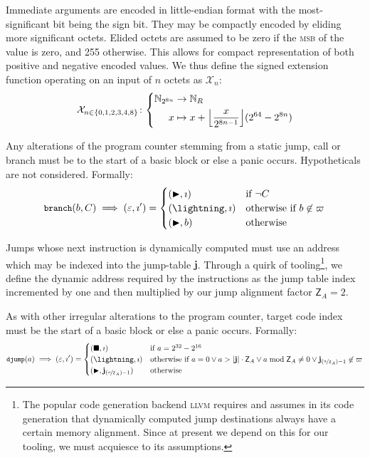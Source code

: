 \newcommand{\sext}{\mathcal{X}}

Immediate arguments are encoded in little-endian format with the most-significant bit being the sign bit. They may be compactly encoded by eliding more significant octets. Elided octets are assumed to be zero if the \textsc{msb} of the value is zero, and 255 otherwise. This allows for compact representation of both positive and negative encoded values. We thus define the signed extension function operating on an input of $n$ octets as $\sext_n$:
\begin{align}\label{eq:signedextension}
  \sext_{n \in \{0, 1, 2, 3, 4, 8\}}\colon\left\{\begin{aligned}
    \N_{2^{8n}} &\to \N_R\\
    x &\mapsto x + \ffrac{x}{2^{8n-1}}(2^{64}-2^{8n})
  \end{aligned}\right.
\end{align}

Any alterations of the program counter stemming from a static jump, call or branch must be to the start of a basic block or else a panic occurs. Hypotheticals are not considered. Formally:
\begin{equation}
  \token{branch}(b, C) \implies (\varepsilon, \imath') = \begin{cases}
    (\continue, \imath) &\when \lnot C \\
    (\panic, \imath) &\otherwhen b \not\in \basicblocks \\
    (\continue, b) &\otherwise
  \end{cases}
\end{equation}

Jumps whose next instruction is dynamically computed must use an address which may be indexed into the jump-table $\mathbf{j}$. Through a quirk of tooling\footnote{The popular code generation backend \textsc{llvm} requires and assumes in its code generation that dynamically computed jump destinations always have a certain memory alignment. Since at present we depend on this for our tooling, we must acquiesce to its assumptions.}, we define the dynamic address required by the instructions as the jump table index incremented by one and then multiplied by our jump alignment factor $\mathsf{Z}_A = 2$.

As with other irregular alterations to the program counter, target code index must be the start of a basic block or else a panic occurs. Formally:
\begin{equation}\label{eq:jumptablealignment}
  \token{djump}(a) \implies (\varepsilon, \imath') = \begin{cases}
    (\halt, \imath) &\when a = 2^{32} - 2^{16}\\
    (\panic, \imath) &\otherwhen a = 0 \vee a > |\mathbf{j}|\cdot\mathsf{Z}_A \vee a \bmod \mathsf{Z}_A \ne 0 \vee \mathbf{j}_{(\nicefrac{a}{\mathsf{Z}_A}) - 1} \not\in \basicblocks \\
    (\continue, \mathbf{j}_{(\nicefrac{a}{\mathsf{Z}_A}) - 1}) &\otherwise
  \end{cases}
\end{equation}

